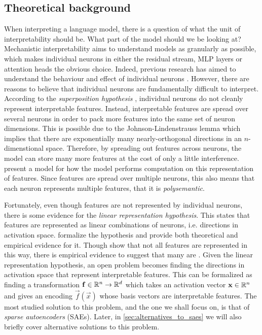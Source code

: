 \subsection{Theoretical background}
When interpreting a language model, there is a question of what the unit of interpretability should be.
What part of the model should we be looking at?
Mechanistic interpretability aims to understand models as granularly as possible, which makes individual neurons in either the residual stream, MLP layers or attention heads the obvious choice.
Indeed, previous research has aimed to understand the behaviour and effect of individual neurons \parencite{foote_neuron_2023}\parencite{bills_language_2023}.
However, there are reasons to believe that individual neurons are fundamentally difficult to interpret.
According to the \emph{superposition hypothesis} \parencite{elhage_toy_2022}, individual neurons do not cleanly represent interpretable features.
Instead, interpretable features are spread over several neurons in order to pack more features into the same set of neuron dimensions.
This is possible due to the Johnson-Lindenstrauss lemma which implies that there are exponentially many nearly-orthogonal directions in an $n$-dimenstional space.
Therefore, by spreading out features across neurons, the model can store many more features at the cost of only a little interference.
\textcite{vaintrob_toward_2024} present a model for how the model performs computation on this representation of features.
Since features are spread over multiple neurons, this also means that each neuron represents multiple features, that it is \emph{polysemantic}.

Fortunately, even though features are not represented by individual neurons, there is some evidence for the \emph{linear representation hypothesis}.
This states that features are represented as linear combinations of neurons, i.e. directions in activation space.
\textcite{park_linear_2023} formalize the hypothesis and provide both theoretical and empirical evidence for it.
Though \textcite{engels_not_2024} show that not all features are represented in this way, there is empirical evidence to suggest that many are \parencite{neel_nanda_actually_2023}.
Given the linear representation hypothesis, an open problem becomes finding the directions in activation space that represent interpretable features.
This can be formalized as finding a transformation $\mathbf{f}\in\mathbb{R}^n\to\mathbb{R}^d$ which takes an activation vector $\mathbf{x}\in\mathbb{R}^n$ and gives an encoding $\vec f(\vec x)$ whose basis vectors are interpretable features.
The most studied solution to this problem, and the one we shall focus on, is that of \emph{sparse autoencoders} (SAEs).
Later, in \ref{sec:alternatives_to_saes} we will also briefly cover alternative solutions to this problem.

